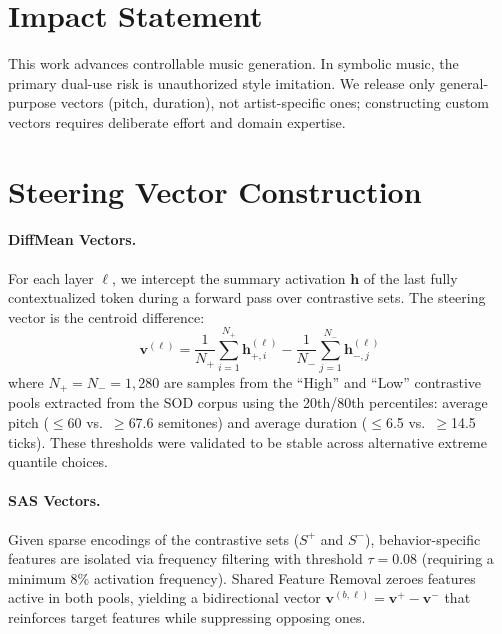 \documentclass{article}
\theoremstyle{plain}
\begin{document}
\section*{Impact Statement}
This work advances controllable music generation. In symbolic music, the primary dual-use risk is unauthorized style imitation. We release only general-purpose vectors (pitch, duration), not artist-specific ones; constructing custom vectors requires deliberate effort and domain expertise.




\newpage
\appendix

\section{Steering Vector Construction}
\label{app:vector_construction}

\paragraph{DiffMean Vectors.}
For each layer $\ell$, we intercept the summary activation $\mathbf{h}$ of the last fully contextualized token during a forward pass over contrastive sets. The steering vector is the centroid difference:
\begin{equation}
    \mathbf{v}^{(\ell)} = \frac{1}{N_+}\sum_{i=1}^{N_+}\mathbf{h}^{(\ell)}_{+,i} - \frac{1}{N_-}\sum_{j=1}^{N_-}\mathbf{h}^{(\ell)}_{-,j}
\end{equation}
where $N_+ = N_- = 1{,}280$ are samples from the ``High'' and ``Low'' contrastive pools extracted from the SOD corpus using the 20th/80th percentiles: average pitch ($\leq$60 vs.\ $\geq$67.6 semitones) and average duration ($\leq$6.5 vs.\ $\geq$14.5 ticks). These thresholds were validated to be stable across alternative extreme quantile choices.

\paragraph{SAS Vectors.}
Given sparse encodings of the contrastive sets ($S^+$ and $S^-$), behavior-specific features are isolated via frequency filtering with threshold $\tau{=}0.08$ (requiring a minimum 8\% activation frequency). Shared Feature Removal zeroes features active in both pools, yielding a bidirectional vector $\mathbf{v}^{(b,\ell)} = \mathbf{v}^{+} - \mathbf{v}^{-}$ that reinforces target features while suppressing opposing ones.
\end{document}
